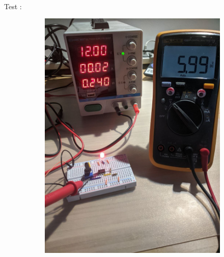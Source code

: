 \documentclass{article}
\begin{document}
\paragraph{}Test :
\begin{figure}[H]
    \centering
    \begin{subfigure}{.4\textwidth}
        \centering
        \includegraphics[width=.9\linewidth]{./images/labo3-verif1.jpg}
    \end{subfigure}
    \begin{subfigure}{.4\textwidth}
        \centering

\end{subfigure}
\end{figure}
\end{document}
